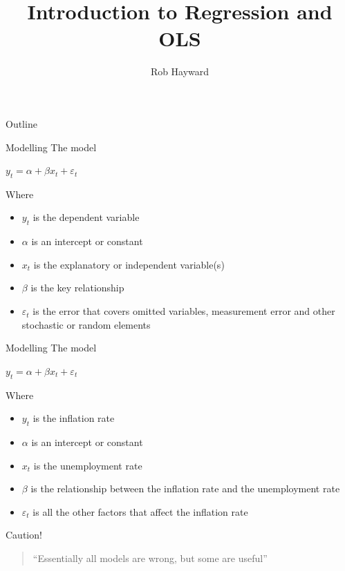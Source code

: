 \documentclass[14pt,xcolor=pdftex,dvipsnames,table]{beamer}\usepackage[]{graphicx}\usepackage[]{color}
\title{Introduction to Regression and OLS}
\author{Rob Hayward}
\begin{document}
\begin{frame}
\titlepage
\end{frame}

\begin{frame}{Outline}
\tableofcontents
\end{frame}



\begin{frame}{Modelling}
The model
\begin{block}{}
$y_t = \alpha + \beta x_t + \varepsilon_t$
\end{block}
\pause
Where 
\begin{itemize}[<+-| alert@+>]
\item $y_t$ is the dependent variable
\item $\alpha$ is an intercept or constant
\item $x_t$ is the explanatory or independent variable(s)
\item $\beta$ is the key relationship
\item $\varepsilon_t$ is the error that covers omitted variables, measurement error and other stochastic or random elements
\end{itemize}
\end{frame}

\begin{frame}{Modelling}
The model
\begin{block}{}
$y_t = \alpha + \beta x_t + \varepsilon_t$
\end{block}

\pause

Where 
\begin{itemize}[<+-| alert@+>]
\item $y_t$ is the inflation rate
\item $\alpha$ is an intercept or constant
\item $x_t$ is the unemployment rate
\item $\beta$ is the relationship between the inflation rate and the unemployment rate
\item $\varepsilon_t$ is all the other factors that affect the inflation rate
\end{itemize}
\end{frame}


\begin{frame}{Caution!}
\begin{block}{}
\begin{quote} ``Essentially all models are wrong, but some are useful''
\end{quote} %
\end{block}
\end{frame}
\end{document}
